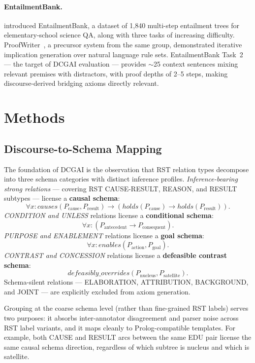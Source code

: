 \documentclass[11pt,letterpaper]{article}
\begin{document}
\paragraph{EntailmentBank.}
\citet{Dalvi2021} introduced EntailmentBank, a dataset of 1,840 multi-step entailment trees for elementary-school
science QA, along with three tasks of increasing difficulty. ProofWriter~\citep{Tafjord2021}, a precursor system from
the same group, demonstrated iterative implication generation over natural language rule sets. EntailmentBank Task~2
--- the target of DCGAI evaluation --- provides $\sim$25 context sentences mixing relevant premises with distractors,
with proof depths of 2--5 steps, making discourse-derived bridging axioms directly relevant.

\section{Methods}

\subsection{Discourse-to-Schema Mapping}
\label{sec:schema-mapping}

The foundation of DCGAI is the observation that RST relation types decompose into three schema categories with
distinct inference profiles. \textit{Inference-bearing strong relations} --- covering RST CAUSE-RESULT, REASON, and
RESULT subtypes --- license a \textbf{causal schema}:
\[
  \forall x: \mathit{causes}(P_{\text{cause}}, P_{\text{result}}) \rightarrow
  (\mathit{holds}(P_{\text{cause}}) \rightarrow \mathit{holds}(P_{\text{result}})).
\]
\textit{CONDITION and UNLESS} relations license a \textbf{conditional schema}:
\[
  \forall x: (P_{\text{antecedent}} \rightarrow P_{\text{consequent}}).
\]
\textit{PURPOSE and ENABLEMENT} relations license a \textbf{goal schema}:
\[
  \forall x: \mathit{enables}(P_{\text{action}}, P_{\text{goal}}).
\]
\textit{CONTRAST and CONCESSION} relations license a \textbf{defeasible contrast schema}:
\[
  \mathit{defeasibly\_overrides}(P_{\text{nucleus}}, P_{\text{satellite}}).
\]
Schema-silent relations --- ELABORATION, ATTRIBUTION, BACKGROUND, and JOINT --- are explicitly excluded from axiom
generation.

Grouping at the coarse schema level (rather than fine-grained RST labels) serves two purposes: it absorbs
inter-annotator disagreement and parser noise across RST label variants, and it maps cleanly to Prolog-compatible
templates. For example, both CAUSE and RESULT arcs between the same EDU pair license the same causal schema
direction, regardless of which subtree is nucleus and which is satellite.
\end{document}
